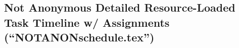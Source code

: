 \documentclass[usenames,dvipsnames,modern]{CLASS_FILES/aastex631}
\newcommand{\noDollarIcon}[4]{\raisebox{#1\normalbaselineskip}[0pt][0pt]{\begin{tikzpicture}
   \draw[fill=white,draw=red,line width=#2] (0,0) circle[radius=#3];
   \draw[line width=#2,red] node[midway,black]{\faDollar} (#4,#4) -- (-#4,-#4);
   \draw[line width=#2,red] (#4,#4) -- (-#4,-#4);
   \end{tikzpicture}}}
\newcommand{\dollarIcon}[3]{\raisebox{#1\normalbaselineskip}[0pt][0pt]{\begin{tikzpicture}
   \draw[fill=green,draw=black] (0,0) circle[radius=#2];
   \draw[draw=green] (-#3,#3) -- (#3,-#3) node[midway]{\faDollar};
   \end{tikzpicture}}}
\begin{document}
\newpage
\subsection{\textbf{Not} Anonymous Detailed Resource-Loaded Task Timeline w/ Assignments (``NOTANONschedule.tex'')}

\def\myTaskTimelineColumnSize{\scriptsize } %
\def\myTaskAssignmentsColumnSize{\scriptsize } %
\def\myTotalFteColumnSize{\scriptsize } %
\def\myYearColumnSize{\scriptsize } %
\def\myTaskTitleColumnSize{\normalsize } %
\def\myQuarterColumnSize{\scriptsize } %
\def\myIdWksColumnSize{\scriptsize } %
\def\mySigmaColumnIcon{\textbf{\large{$\Sigma$}}} %
\def\myNoDollarColumnIcon{\noDollarIcon{-0.4}{0.4mm}{0.2}{0.15}}  %
\def\myDollarColumnIcon{\dollarIcon{-0.4}{0.2}{0.015}}  %
\def\mySigmaCaptionIcon{\textbf{\large{$\Sigma$}} $=$} %
\def\myNoDollarCaptionIcon{\noDollarIcon{-0.3}{0.4mm}{0.2}{0.15}\hspace{-0.3em}$=$}  %
\def\myDollarCaptionIcon{\dollarIcon{-0.3}{0.2}{0.015}\hspace{-0.3em}$=$}  %
\def\myTaskCategoryLabel#1#2{{\normalsize\textbf\scshape{#1}}~{\normalsize\textbf{#2}}}  %
\def\myTaskTitleLabel#1#2{~{\scriptsize{\textbf{\scshape{#1}}}}~{\color{mediumelectricblue}{\footnotesize\textbf{#2}}}}  %
\def\myFteTotalFormat#1{\small #1} %
\def\myFteUnfundedFormat#1{\small #1} %
\def\myFteFundedFormat#1{\small \color{blue} #1} %
\def\myTimelineColor{mediumelectricblue} %
\def\myTimelineSize{\tiny} %
\def\myFundedUsTeam#1{\small \color{blue} #1} %
\def\myUnfundedUsTeam#1{\small \color{black} #1} %
\def\myInternationalTeam#1{\small \color{red} #1} %
\end{document}
